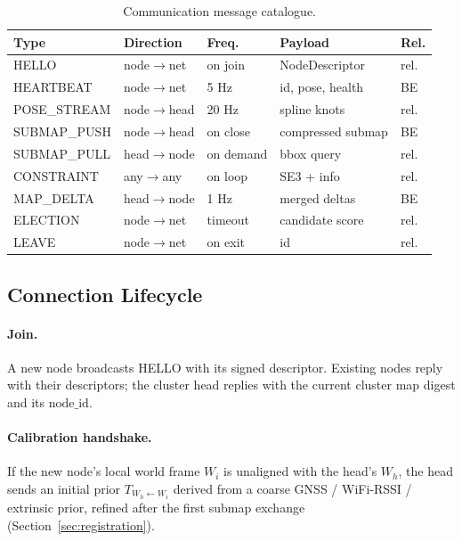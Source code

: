 \begin{table}[t]
  \centering
  \caption{Communication message catalogue.}
  \label{tab:messages}
  \small
  \begin{tabular}{lllll}
    \toprule
    Type & Direction & Freq. & Payload & Rel. \\
    \midrule
    HELLO        & node$\to$net   & on join   & NodeDescriptor    & rel. \\
    HEARTBEAT    & node$\to$net   & 5 Hz      & id, pose, health  & BE   \\
    POSE\_STREAM & node$\to$head  & 20 Hz     & spline knots      & rel. \\
    SUBMAP\_PUSH & node$\to$head  & on close  & compressed submap & BE   \\
    SUBMAP\_PULL & head$\to$node  & on demand & bbox query        & rel. \\
    CONSTRAINT   & any$\to$any    & on loop   & SE3 + info        & rel. \\
    MAP\_DELTA   & head$\to$node  & 1 Hz      & merged deltas     & BE   \\
    ELECTION     & node$\to$net   & timeout   & candidate score   & rel. \\
    LEAVE        & node$\to$net   & on exit   & id                & rel. \\
    \bottomrule
  \end{tabular}
\end{table}

\subsection{Connection Lifecycle}
\label{sec:lifecycle}

\paragraph{Join.} A new node broadcasts HELLO with its signed descriptor.
Existing nodes reply with their descriptors; the cluster head replies with the
current cluster map digest and its $\text{node\_id}$.

\paragraph{Calibration handshake.} If the new node's local world frame $W_i$
is unaligned with the head's $W_h$, the head sends an initial prior
$T_{W_h \leftarrow W_i}$ derived from a coarse GNSS / WiFi-RSSI / extrinsic
prior, refined after the first submap exchange (Section~\ref{sec:registration}).

